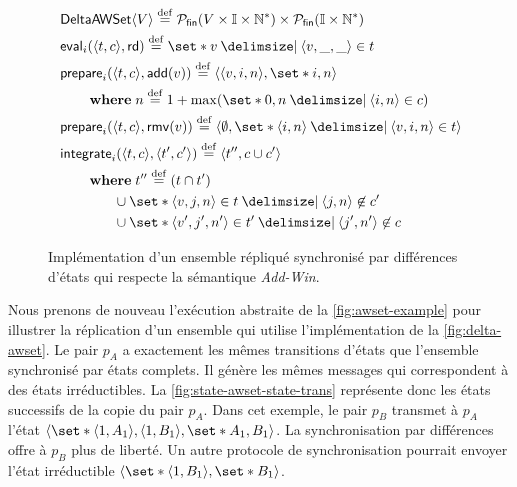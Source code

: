 \begin{figure}[bth]
\centering
\begin{align}
&\trm{DeltaAWSet}\tuple*{V} \defeq \powerfset{V \times \mathbb{I} \times \mathbb{N}^*} \times \powerfset{\mathbb{I} \times \mathbb{N}^*} \label{eq:delta-awset-state}\\
&\trm{eval}_i(\tuple*{t, c}, \trm{rd}) \defeq \set*{v \given \tuple*{v, \_, \_} \in t} \label{eq:delta-awset-eval}\\
&\begin{aligned}
\MoveEqLeft\trm{prepare}_i(\tuple*{t, c}, \trm{add}(v)) \defeq \tuple*{\tuple*{v, i, n},\set*{i, n}}\\
    &\where n \defeq 1 + \max(\set*{0,n \given \tuple*{i, n} \in c})
\end{aligned}\label{eq:delta-awset-prep-add}\\
&\trm{prepare}_i(\tuple*{t, c}, \trm{rmv}(v)) \defeq \tuple*{\emptyset, \set*{\tuple*{i, n} \given \tuple*{v, i, n} \in t}}\label{eq:delta-awset-prep-rmv}\\
&\begin{aligned}
\MoveEqLeft \trm{integrate}_i(\tuple*{t, c}, \tuple*{t', c'}) \defeq \tuple*{t'', c \cup c'}\\
    &\begin{aligned}
    \MoveEqLeft\where t'' \defeq (t \cap t')\\
    &\cup \set*{\tuple*{v, j, n} \in t \given \tuple*{j, n} \not\in c'}\\
    &\cup \set*{\tuple*{v', j', n'} \in t' \given \tuple*{j', n'} \not\in c}
    \end{aligned}
\end{aligned}\label{eq:delta-awset-integr}
\end{align}
\caption[Implémentation d'un ensemble répliqué synchronisé par différences d'états]{Implémentation d'un ensemble répliqué synchronisé par différences d'états qui respecte la sémantique \emph{Add-Win}.}\label{fig:delta-awset}
\end{figure}

Nous prenons de nouveau l'exécution abstraite de la \autoref{fig:awset-example} pour illustrer la réplication d'un ensemble qui utilise l'implémentation de la \autoref{fig:delta-awset}.
Le pair $p_A$ a exactement les mêmes transitions d'états que l'ensemble synchronisé par états complets.
Il génère les mêmes messages qui correspondent à des états irréductibles.
La \autoref{fig:state-awset-state-trans} représente donc les états successifs de la copie du pair $p_A$.
Dans cet exemple, le pair $p_B$ transmet à $p_A$ l'état $\tuple*{\set*{\tuple*{1,A_1},\tuple*{1,B_1}},\set*{A_1,B_1}}$.
La synchronisation par différences offre à $p_B$ plus de liberté.
Un autre protocole de synchronisation pourrait envoyer l'état irréductible $\tuple*{\set*{\tuple*{1,B_1}},\set*{B_1}}$.

